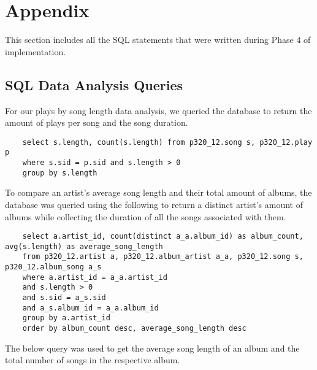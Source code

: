 \documentclass[12pt]{article}
\begin{document}
    \section{Appendix}

    This section includes all the SQL statements that were written during Phase 4 of
    implementation.

    \subsection{SQL Data Analysis Queries}


    \noindent For our plays by song length data analysis, we queried the
    database to return the amount of plays per song and the song duration.

    \begin{lstlisting}
    select s.length, count(s.length) from p320_12.song s, p320_12.play p
    where s.sid = p.sid and s.length > 0
    group by s.length
    \end{lstlisting}

    \noindent To compare an artist's average song length and their total amount
    of albums, the database was queried using the following to return
    a distinct artist's amount of albums while collecting the duration of all
    the songs associated with them.
    
    \begin{lstlisting}
    select a.artist_id, count(distinct a_a.album_id) as album_count, avg(s.length) as average_song_length
    from p320_12.artist a, p320_12.album_artist a_a, p320_12.song s, p320_12.album_song a_s
    where a.artist_id = a_a.artist_id
    and s.length > 0
    and s.sid = a_s.sid
    and a_s.album_id = a_a.album_id
    group by a.artist_id
    order by album_count desc, average_song_length desc

    \end{lstlisting}

    \noindent The below query was used to get the average song length
    of an album and the total number of songs in the respective album.
\end{document}
